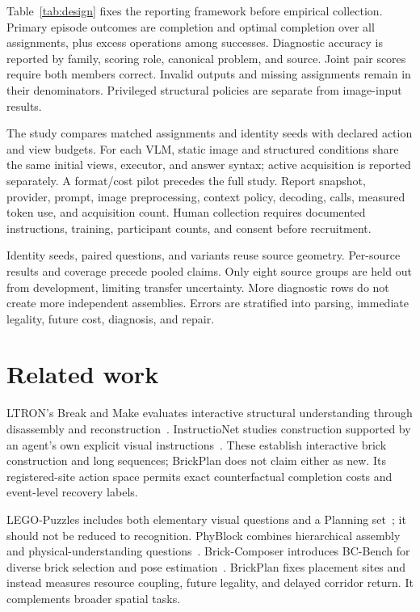 \documentclass[10pt,twocolumn,letterpaper]{article}
\begin{document}
Table~\ref{tab:design} fixes the reporting framework before empirical
collection. Primary episode outcomes are completion and optimal
completion over all assignments, plus excess operations among successes.
Diagnostic accuracy is reported by family, scoring role, canonical
problem, and source. Joint pair scores require both members correct.
Invalid outputs and missing assignments remain in their denominators.
Privileged structural policies are separate from image-input results.

The study compares matched assignments and identity seeds with declared
action and view budgets. For each VLM, static image and structured
conditions share the same initial views, executor, and answer syntax;
active acquisition is reported separately. A format/cost pilot precedes
the full study. Report snapshot, provider, prompt, image preprocessing,
context policy, decoding, calls, measured token use, and acquisition
count. Human collection requires documented instructions, training,
participant counts, and consent before recruitment.

Identity seeds, paired questions, and variants reuse source geometry.
Per-source results and coverage precede pooled claims. Only eight source
groups are held out from development, limiting transfer uncertainty.
More diagnostic rows do not create more independent assemblies.
Errors are stratified into parsing, immediate legality, future cost,
diagnosis, and repair.

\section{Related work}
LTRON's Break and Make evaluates interactive structural understanding
through disassembly and reconstruction~\cite{ltron}. InstructioNet studies
construction supported by an agent's own explicit visual
instructions~\cite{instructionet}. These establish interactive brick
construction and long sequences; BrickPlan does not claim either as new.
Its registered-site action space permits exact counterfactual completion
costs and event-level recovery labels.

LEGO-Puzzles includes both elementary visual questions and a Planning
set~\cite{lego}; it should not be reduced to recognition.
PhyBlock combines hierarchical assembly and physical-understanding
questions~\cite{phyblock}. Brick-Composer introduces BC-Bench for diverse
brick selection and pose estimation~\cite{composer}. BrickPlan fixes
placement sites and instead measures resource coupling, future legality,
and delayed corridor return. It complements broader spatial tasks.
\end{document}
